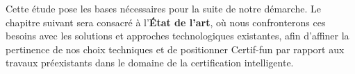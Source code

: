Cette étude pose les bases nécessaires pour la suite de notre démarche. Le chapitre suivant sera consacré à l'\textbf{État de l'art}, où nous confronterons ces besoins avec les solutions et approches technologiques existantes, afin d'affiner la pertinence de nos choix techniques et de positionner Certif-fun par rapport aux travaux préexistants dans le domaine de la certification intelligente.
